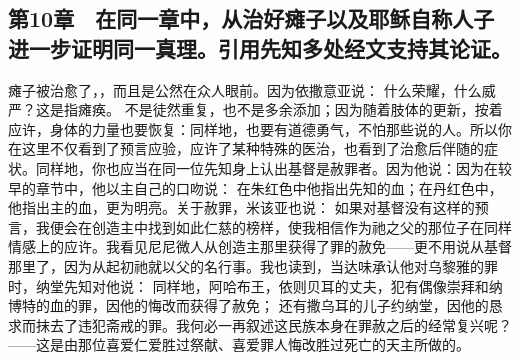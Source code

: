 
\subsection{第10章　在同一章中，从治好瘫子以及耶稣自称人子进一步证明同一真理。引用先知多处经文支持其论证。}

瘫子被治愈了，\newline{}，而且是公然在众人眼前。因为依撒意亚说：\newline{} 什么荣耀，什么威严？这是指瘫痪。\newline{} 不是徒然重复，也不是多余添加；因为随着肢体的更新，按着应许，身体的力量也要恢复：同样地，也要有道德勇气，不怕那些说的人。所以你在这里不仅看到了预言应验，应许了某种特殊的医治，也看到了治愈后伴随的症状。同样地，你也应当在同一位先知身上认出基督是赦罪者。因为他说：因为在较早的章节中，他以主自己的口吻说：\newline{} 在朱红色中他指出先知的血；在丹红色中，他指出主的血，更为明亮。关于赦罪，米该亚也说：\newline{} 如果对基督没有这样的预言，我便会在创造主中找到如此仁慈的榜样，使我相信作为祂之父的那位子在同样情感上的应许。我看见尼尼微人从创造主那里获得了罪的赦免\newline{}——更不用说从基督那里了，因为从起初祂就以父的名行事。我也读到，当达味承认他对乌黎雅的罪时，纳堂先知对他说：\newline{} 同样地，阿哈布王，依则贝耳的丈夫，犯有偶像崇拜和纳博特的血的罪，因他的悔改而获得了赦免；\newline{} 还有撒乌耳的儿子约纳堂，因他的恳求而抹去了违犯斋戒的罪。我何必一再叙述这民族本身在罪赦之后的经常复兴呢？——这是由那位喜爱仁爱胜过祭献、喜爱罪人悔改胜过死亡的天主所做的。\newline{} 